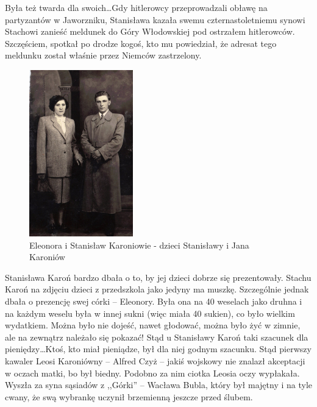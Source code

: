 Była też twarda dla swoich\ldots Gdy hitlerowcy przeprowadzali obławę na partyzantów w Jaworzniku, Stanisława kazała swemu czternastoletniemu synowi Stachowi zanieść meldunek do Góry Włodowskiej pod ostrzałem hitlerowców. Szczęściem, spotkał po drodze kogoś, kto mu powiedział, że adresat tego meldunku został właśnie przez Niemców zastrzelony.


\begin{figure}[!h]
\begin{center}
\includegraphics[width=0.4\textwidth]{zdjecia/eleonora_i_stanislaw_karoniowie.jpg}
\caption[Eleonora i Stanisław Karoniowie]{Eleonora i Stanisław Karoniowie - dzieci Stanisławy i Jana Karoniów}
\label{rys:eleonora_i_stanislaw_karoniowie}
\end{center}
\end{figure}

Stanisława Karoń bardzo dbała o to, by jej dzieci dobrze się prezentowały. Stachu Karoń na zdjęciu
dzieci z przedszkola jako jedyny ma muszkę. Szczególnie jednak dbała o prezencję swej córki -- Eleonory. Była ona na 40 weselach jako druhna i na każdym weselu była w innej sukni (więc miała 40 sukien), co było wielkim wydatkiem. Można było nie dojeść, nawet głodować, można było żyć w zimnie, ale na zewnątrz należało się pokazać! Stąd u Stanisławy Karoń taki szacunek dla pieniędzy\ldots Ktoś, kto miał pieniądze, był dla niej godnym szacunku. Stąd pierwszy kawaler Leosi Karoniówny -- Alfred Czyż -- jakiś wojskowy nie znalazł akceptacji w oczach matki, bo był biedny. Podobno za nim ciotka Leosia oczy wypłakała. Wyszła za syna sąsiadów z ,,Górki'' -- Wacława Bubla, który był majętny i na tyle cwany, że swą wybrankę uczynił brzemienną jeszcze przed ślubem.


